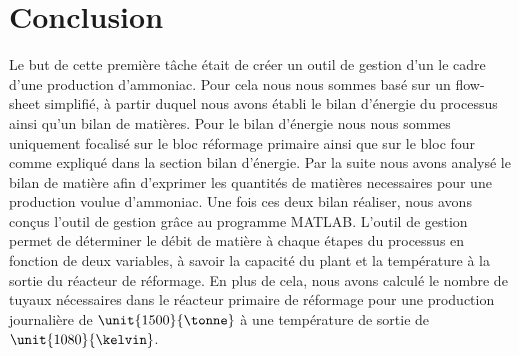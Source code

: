 \section{Conclusion}
Le but de cette première tâche était de créer un outil de gestion d'un le cadre d'une production d'ammoniac. 
Pour cela nous nous sommes basé sur un flow-sheet simplifié, à partir duquel nous avons établi le bilan d'énergie du processus
ainsi qu'un bilan de matières. Pour le bilan d'énergie nous nous sommes uniquement focalisé sur le bloc réformage primaire ainsi
que sur le bloc four comme expliqué dans la section bilan d'énergie. Par la suite nous avons analysé le bilan de matière 
afin d'exprimer les quantités de matières necessaires pour une production voulue d'ammoniac. Une fois ces deux bilan 
réaliser, nous avons conçus l'outil de gestion grâce au programme \textsc{MATLAB}. L'outil de gestion permet de déterminer le débit 
de matière à chaque étapes du processus en fonction de deux variables, à savoir la capacité du plant et la température à 
la sortie du réacteur de réformage. En plus de cela, nous avons calculé le nombre de tuyaux nécessaires dans le réacteur
primaire de réformage pour une production journalière de $\unit{1500}{\tonne}$ à une température de sortie de 
$\unit{1080}{\kelvin}$.
